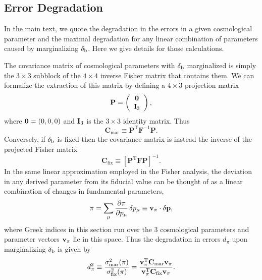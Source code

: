 \documentclass[prd,twocolumn,amsmath,amssymb,floatfix,superscriptaddress]{revtex4-1}
\newcommand{\br}{{\rm b}}
\begin{document}
{{\subsection{Error Degradation}
\label{sec:errordeg}
In the main text, we quote the degradation in the errors in a given cosmological parameter
and the maximal degradation for any linear combination of parameters caused
by marginalizing $\delta_\br$.    Here we give details for those calculations.

The covariance matrix of cosmological parameters with $\delta_\br$ marginalized is
simply the $3\times 3$ subblock of the $4\times 4$ inverse Fisher matrix that contains them.  
We can formalize the extraction of this matrix by defining a $4\times3$ 
projection matrix 
\begin{equation}
{\bf P} = \left(
\begin{array}{c}
 {\bf 0} \\
 {\bf I}_3 \\
\end{array}
\right),
\end{equation}
where ${\bf 0}=(0,0,0)$ and ${\bf I}_3$ is the $3 \times 3$ identity matrix.   Thus
\begin{equation}
    \mathbf{C}_\textrm{mar} \equiv \mathbf{P}^\mathrm{T} \mathbf{F}^{-1} \mathbf{P}.
    \label{eq:Cmar}
\end{equation}
Conversely, if $\delta_\br$ is fixed then the covariance matrix is instead the
inverse of the projected Fisher matrix
\begin{equation}
    \mathbf{C}_\textrm{fix} \equiv [\mathbf{P}^\mathrm{T} \mathbf{F} \mathbf{P}]^{-1}.
    \label{eq:Cfix}
\end{equation}
In the same linear approximation employed in the Fisher analysis, the deviation in any derived parameter from its fiducial value can be thought of
as a linear combination of changes in fundamental parameters,
\begin{equation}
    \pi = \sum_\mu \frac{\partial \pi}{\partial p_{\mu}} \, \delta p_\mu \equiv {\bf v}_\pi \cdot \delta{\bf p},
\end{equation}
where Greek indices in this section run over the 3 cosmological parameters and parameter
vectors ${\bf v}_\pi$ lie in this space.
Thus the degradation in errors $d_\pi$ upon marginalizing $\delta_\br$ is given by
\begin{align}
d_\pi^2 \equiv \frac{\sigma^2_\textrm{mar}(\pi)}{\sigma^2_\textrm{fix}(\pi) } =
\frac{ {\bf v}_\pi^\mathrm{T} \mathbf{C}_\textrm{mar} {\bf v}_\pi }
{ {\bf v}_\pi^\mathrm{T} \mathbf{C}_\textrm{fix} {\bf v}_\pi }.
\end{align}

}}
\end{document}
